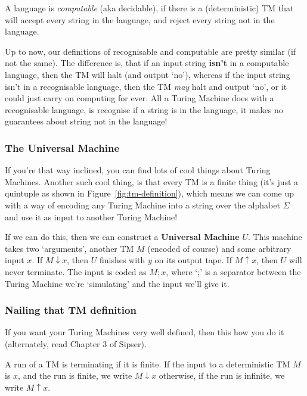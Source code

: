 A language is \textit{computable} (aka decidable), if there is a (deterministic)
TM that will accept every string in the language, and reject every string not in
the language.

Up to now, our definitions of recognisable and computable are pretty similar (if
not the same). The difference is, that if an input string \textbf{isn't} in a
computable language, then the TM will halt (and output `no'), whereas if the
input string isn't in a recognisable language, then the TM \textit{may} halt and
output `no', or it could just carry on computing for ever. All a Turing Machine
does with a recognisable language, is recognise if a string is in the language,
it makes no guarantees about string not in the language!

\subsubsection{The Universal Machine}

If you're that way inclined, you can find lots of cool things about Turing
Machines. Another such cool thing, is that every TM is a finite thing (it's just
a quintuple as shown in Figure~\ref{fig:tm-definition}), which means we can come
up with a way of encoding any Turing Machine into a string over the alphabet
$\Sigma$ and use it as input to another Turing Machine!

If we can do this, then we can construct a \textbf{Universal Machine} $U$. This
machine takes two `arguments', another TM $M$ (encoded of course) and some
arbitrary input $x$. If $M \downarrow x$, then $U$ finishes with $y$ on its
output tape. If $M \uparrow x$, then $U$ will never terminate. The input is
coded as $M;x$, where `;' is a separator between the Turing Machine we're
`simulating' and the input we'll give it.

\subsubsection{Nailing that TM definition}

If you want your Turing Machines very well defined, then this how you do it
(alternately, read Chapter 3 of Sipser).


A run of a TM is terminating if it is finite. If the input to a deterministic TM
$M$ is $x$, and the run is finite, we write $M \downarrow x$ otherwise, if the
run is infinite, we write $M \uparrow x$.

